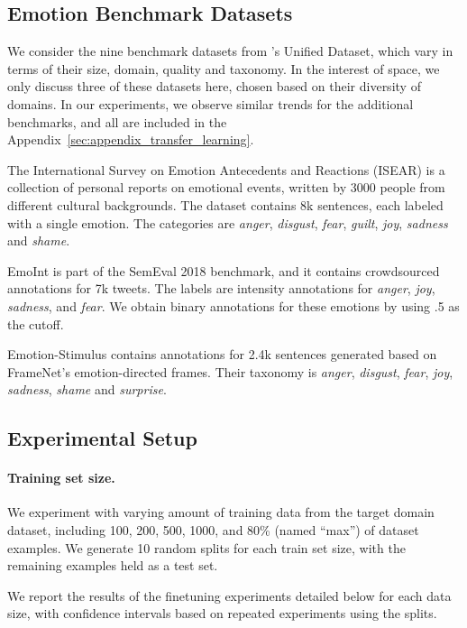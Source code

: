 \documentclass[11pt,a4paper]{article}
\begin{document}
\subsection{Emotion Benchmark Datasets}
We consider the nine benchmark datasets from \citet{unified-klinger2018analysis}'s Unified Dataset, which vary in terms of their size, domain, quality and taxonomy. In the interest of space, we only discuss three of these datasets here, chosen based on their diversity of domains. In our experiments, we observe similar trends for the additional benchmarks, and all are included in the Appendix~\ref{sec:appendix_transfer_learning}.

The International Survey on Emotion Antecedents and Reactions (ISEAR) \citep{scherer1994evidence} is a collection of personal reports on emotional events, written by 3000 people from different cultural backgrounds. The dataset contains 8k sentences, each labeled with a single emotion. The categories are \emph{anger}, \emph{disgust}, \emph{fear}, \emph{guilt}, \emph{joy}, \emph{sadness} and \emph{shame}.




EmoInt \citep{mohammad-etal-2018-semeval} is part of the SemEval 2018 benchmark, and it contains crowdsourced annotations for 7k tweets. The labels are intensity annotations for \emph{anger}, \emph{joy}, \emph{sadness}, and \emph{fear}. We obtain binary annotations for these emotions by using .5 as the cutoff.

Emotion-Stimulus \citep{ghazi2015detecting} contains annotations for 2.4k sentences generated based on FrameNet's emotion-directed frames. Their taxonomy is \emph{anger}, \emph{disgust}, \emph{fear}, \emph{joy}, \emph{sadness}, \emph{shame} and \emph{surprise}.

\subsection{Experimental Setup}
\label{ssec:transfer_learning_setup}

\paragraph{Training set size.} We experiment with varying amount of training data from the target domain dataset, including 100, 200, 500, 1000, and 80\% (named ``max'') of dataset examples. We generate 10 random splits for each train set size, with the remaining examples held as a test set.

We report the results of the finetuning experiments detailed below for each data size, with confidence intervals based on repeated experiments using the splits.
\end{document}
